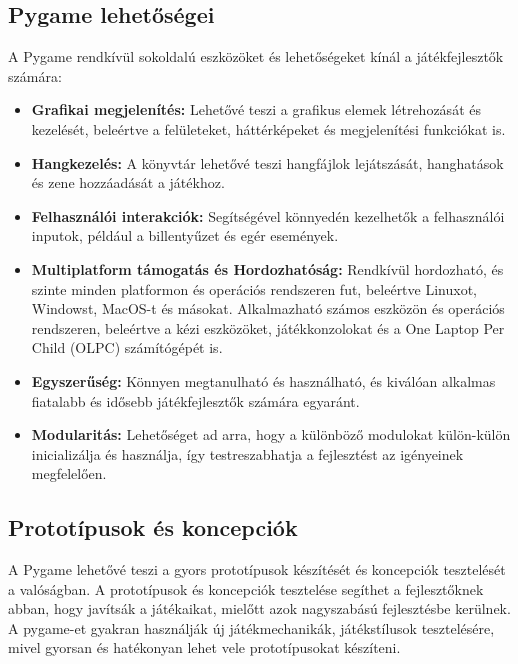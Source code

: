 \subsection{Pygame lehetőségei}
 A Pygame rendkívül sokoldalú eszközöket és lehetőségeket kínál a játékfejlesztők számára:

\begin{itemize}
    
\item    \textbf{Grafikai megjelenítés:} Lehetővé teszi a grafikus elemek létrehozását és kezelését, beleértve a felületeket, háttérképeket és megjelenítési funkciókat is.
    
\item    \textbf{Hangkezelés:} A könyvtár lehetővé teszi hangfájlok lejátszását, hanghatások és zene hozzáadását a játékhoz.
    
\item    \textbf{Felhasználói interakciók:} Segítségével könnyedén kezelhetők a felhasználói inputok, például a billentyűzet és egér események.
    
\item    \textbf{Multiplatform támogatás és Hordozhatóság:} Rendkívül hordozható, és szinte minden platformon és operációs rendszeren fut, beleértve Linuxot, Windowst, MacOS-t és másokat. Alkalmazható számos eszközön és operációs rendszeren, beleértve a kézi eszközöket, játékkonzolokat és a One Laptop Per Child (OLPC)\cite{olpc} számítógépét is.
    
\item    \textbf{Egyszerűség:} Könnyen megtanulható és használható, és kiválóan alkalmas fiatalabb és idősebb játékfejlesztők számára egyaránt.
    
\item    \textbf{Modularitás:} Lehetőséget ad arra, hogy a különböző modulokat külön-külön inicializálja és használja, így testreszabhatja a fejlesztést az igényeinek megfelelően.
\end{itemize}


\subsection{Prototípusok és koncepciók}
 A Pygame lehetővé teszi a gyors prototípusok készítését és koncepciók tesztelését a valóságban. A prototípusok és koncepciók tesztelése segíthet a fejlesztőknek abban, hogy javítsák a játékaikat, mielőtt azok nagyszabású fejlesztésbe kerülnek. A pygame-et gyakran használják új játékmechanikák, játékstílusok tesztelésére, mivel gyorsan és hatékonyan lehet vele prototípusokat készíteni.

